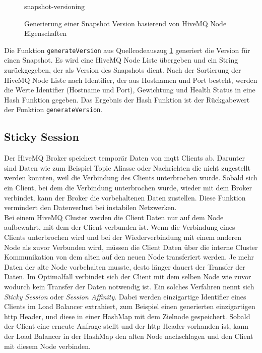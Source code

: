 \begin{figure}
    {snapshot-versioning}
    \caption{Generierung einer Snapshot Version basierend von HiveMQ Node Eigenschaften}
    \label{code:snapshot-versioning}
\end{figure}
Die Funktion \verb|generateVersion| aus Quellcodeauszug \ref{code:snapshot-versioning} generiert die Version für einen Snapshot. Es wird eine HiveMQ Node Liste übergeben und ein String zurückgegeben, der als Version des Snapshots dient. Nach der Sortierung der HiveMQ Node Liste nach Identifier, der aus Hostnamen und Port besteht, werden die Werte Identifier (Hostname und Port), Gewichtung und Health Status in eine Hash Funktion gegeben. Das Ergebnis der Hash Funktion ist der Rückgabewert der Funktion \verb|generateVersion|.

\subsection{Sticky Session} \label{ss:sticky-session}
Der HiveMQ Broker speichert temporär Daten von \ac{mqtt} Clients ab. Darunter sind Daten wie zum Beispiel Topic Aliasse oder Nachrichten die nicht zugestellt werden konnten, weil die Verbindung des Clients unterbrochen wurde. Sobald sich ein Client, bei dem die Verbindung unterbrochen wurde, wieder mit dem Broker verbindet, kann der Broker die vorbehaltenen Daten zustellen. Diese Funktion vermindert den Datenverlust bei instabilen Netzwerken.
\\
Bei einem HiveMQ Cluster werden die Client Daten nur auf dem Node aufbewahrt, mit dem der Client verbunden ist. Wenn die Verbindung eines Clients unterbrochen wird und bei der Wiederverbindung mit einem anderen Node als zuvor Verbunden wird, müssen die Client Daten über die interne Cluster Kommunikation von dem alten auf den neuen Node transferiert werden. Je mehr Daten der alte Node vorbehalten musste, desto länger dauert der Transfer der Daten.
Im Optimalfall verbindet sich der Client mit dem selben Node wie zuvor wodurch kein Transfer der Daten notwendig ist.
Ein solches Verfahren nennt sich \textit{Sticky Session} oder \textit{Session Affinity}. Dabei werden einzigartige Identifier eines Clients im Load Balancer extrahiert, zum Beispiel einen generierten einzigartigen \ac{http} Header, und diese in einer HashMap mit dem Zielnode gespeichert. Sobald der Client eine erneute Anfrage stellt und der \ac{http} Header vorhanden ist, kann der Load Balancer in der HashMap den alten Node nachschlagen und den Client mit diesem Node verbinden. %

